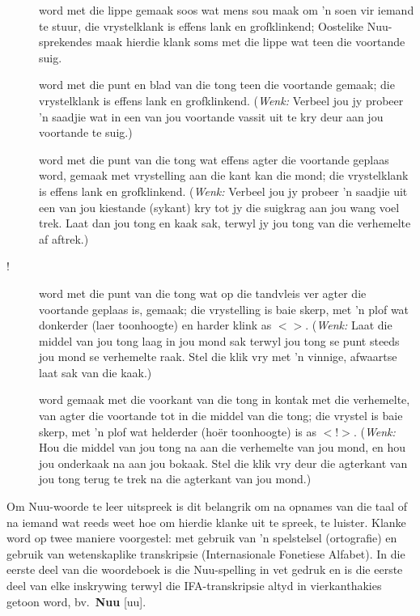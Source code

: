 \begin{description}
    \item [] word met die lippe gemaak soos wat mens sou
        maak om 'n soen vir iemand te stuur, die vrystelklank is
        effens lank en grofklinkend; Oostelike
        N\textipa{\textvertline}uu-sprekendes maak hierdie klank soms
        met die lippe wat teen die voortande suig.
    \item [\textipa{\textvertline}] word met die punt en blad van die
        tong teen die voortande gemaak; die vrystelklank is effens
        lank en grofklinkend. (\emph{Wenk:} Verbeel jou jy probeer 'n saadjie
        wat in een van jou voortande vassit uit te kry deur aan jou
        voortande te suig.)
    \item [\textipa{\textdoublevertline}] word met die punt van die
        tong wat effens agter die voortande geplaas word, gemaak met
        vrystelling aan die kant kan die mond; die vrystelklank is
        effens lank en grofklinkend. (\emph{Wenk:} Verbeel jou jy probeer 'n
        saadjie uit een van jou kiestande (sykant) kry tot jy die
        suigkrag aan jou wang voel trek. Laat dan jou tong en kaak
        sak, terwyl jy jou tong van die verhemelte af aftrek.)
    \item [!] word met die punt van die tong wat op die tandvleis ver
        agter die voortande geplaas is, gemaak; die vrystelling is
        baie skerp, met 'n plof wat donkerder (laer toonhoogte) en
        harder klink as $<$\textipa{\textdoublebarpipe}$>$.
        (\emph{Wenk:}
        Laat die middel van jou tong laag in jou mond sak terwyl jou
        tong se punt steeds jou mond se verhemelte raak. Stel die klik
        vry met 'n vinnige, afwaartse laat sak van die kaak.)
    \item [\textipa{\textdoublebarpipe}] word gemaak met die voorkant
        van die tong in kontak met die verhemelte, van agter die
        voortande tot in die middel van die tong; die vrystel is baie
        skerp, met 'n plof wat helderder (ho\"{e}r toonhoogte) is as
        $<$!$>$. (\emph{Wenk:} Hou die middel van jou tong na aan die
        verhemelte van jou mond, en hou jou onderkaak na aan jou
        bokaak. Stel die klik vry deur die agterkant van jou tong
        terug te trek na die agterkant van jou mond.)
\end{description}

Om N\textipa{\textvertline}uu-woorde te leer uitspreek is dit
belangrik om na opnames van die taal of na iemand wat reeds weet hoe
om hierdie klanke uit te spreek, te luister. Klanke word op twee
maniere voorgestel: met gebruik van  'n spelstelsel (ortografie) en
gebruik van wetenskaplike transkripsie (Internasionale Fonetiese
Alfabet). In die eerste deel van die woordeboek is die
N\textipa{\textvertline}uu-spelling in vet gedruk en is die eerste
deel van elke inskrywing terwyl die IFA-transkripsie altyd in
vierkanthakies getoon word, bv.\
\textbf{N\textipa{\textvertline}uu}
[uu].\\

